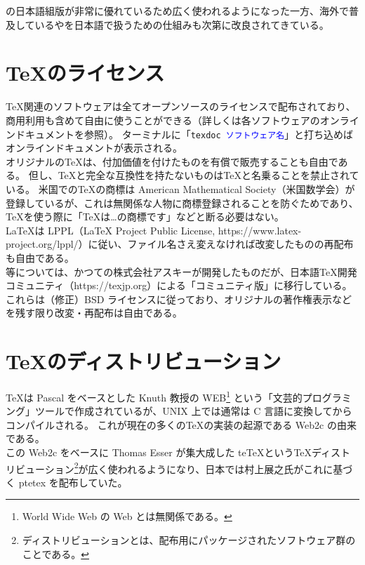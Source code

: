 \pTeX{}の日本語組版が非常に優れているため広く使われるようになった一方、海外で普及している\XeTeX{}や\LuaTeX{}を日本語で扱うための仕組みも次第に改良されてきている。
\section{\TeX{}のライセンス}
\TeX{}関連のソフトウェアは全てオープンソースのライセンスで配布されており、商用利用も含めて自由に使うことができる（詳しくは各ソフトウェアのオンラインドキュメントを参照）。
ターミナルに「\texttt{texdoc \textcolor{blue}{ソフトウェア名}}」と打ち込めばオンラインドキュメントが表示される。\\

オリジナルの\TeX{}は、付加価値を付けたものを有償で販売することも自由である。
但し、\TeX{}と完全な互換性を持たないものは\TeX{}と名乗ることを禁止されている。
米国での\TeX{}の商標は American Mathematical Society（米国数学会）が登録しているが、これは無関係な人物に商標登録されることを防ぐためであり、\TeX{}を使う際に「\TeX{}は…の商標です」などと断る必要はない。\\

\LaTeX{}は LPPL（\LaTeX{} Project Public License, https://www.latex-project.org/lppl/）に従い、ファイル名さえ変えなければ改変したものの再配布も自由である。\\

\pLaTeX{}等については、かつての株式会社アスキーが開発したものだが、日本語\TeX{}開発コミュニティ（https://texjp.org）による「コミュニティ版」に移行している。
これらは（修正）BSD ライセンスに従っており、オリジナルの著作権表示などを残す限り改変・再配布は自由である。
\section{\TeX{}のディストリビューション}
\TeX{}は Pascal をベースとした Knuth 教授の WEB\footnote{World Wide Web の Web とは無関係である。} という「文芸的プログラミング」ツールで作成されているが、UNIX 上では通常は C 言語に変換してからコンパイルされる。\enlargethispage{+0.40zw}
これが現在の多くの\TeX{}の実装の起源である Web2c の由来である。\\

この Web2c をベースに Thomas Esser が集大成した te\TeX{}という\TeX{}ディストリビューション\footnote{ディストリビューションとは、配布用にパッケージされたソフトウェア群のことである。}が広く使われるようになり、日本では村上展之{\small 氏}がこれに基づく ptetex を配布していた。\\

